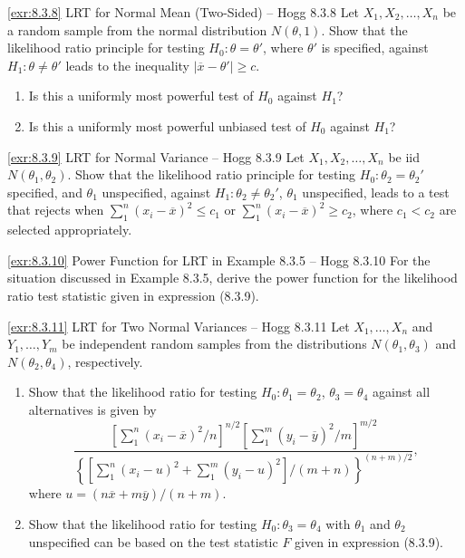 \begin{exercise}{\ref{exr:8.3.8} LRT for Normal Mean (Two-Sided) -- Hogg 8.3.8}\label{exr:8.3.8}
Let $X_1, X_2, \ldots, X_n$ be a random sample from the normal distribution $N(\theta, 1)$. Show that the likelihood ratio principle for testing $H_0: \theta = \theta'$, where $\theta'$ is specified, against $H_1: \theta \neq \theta'$ leads to the inequality $|\overline{x} - \theta'| \geq c$.
\begin{enumerate}
\item[(a)] Is this a uniformly most powerful test of $H_0$ against $H_1$?
\item[(b)] Is this a uniformly most powerful unbiased test of $H_0$ against $H_1$?
\end{enumerate}
\end{exercise}

\begin{exercise}{\ref{exr:8.3.9} LRT for Normal Variance -- Hogg 8.3.9}\label{exr:8.3.9}
Let $X_1, X_2, \ldots, X_n$ be iid $N(\theta_1, \theta_2)$. Show that the likelihood ratio principle for testing $H_0: \theta_2 = \theta_2'$ specified, and $\theta_1$ unspecified, against $H_1: \theta_2 \neq \theta_2'$, $\theta_1$ unspecified, leads to a test that rejects when $\sum_{1}^n(x_i - \overline{x})^2 \leq c_1$ or $\sum_{1}^n(x_i - \overline{x})^2 \geq c_2$, where $c_1 < c_2$ are selected appropriately.
\end{exercise}

\begin{exercise}{\ref{exr:8.3.10} Power Function for LRT in Example 8.3.5 -- Hogg 8.3.10}\label{exr:8.3.10}
For the situation discussed in Example 8.3.5, derive the power function for the likelihood ratio test statistic given in expression (8.3.9).
\end{exercise}

\begin{exercise}{\ref{exr:8.3.11} LRT for Two Normal Variances -- Hogg 8.3.11}\label{exr:8.3.11}
Let $X_1, \ldots, X_n$ and $Y_1, \ldots, Y_m$ be independent random samples from the distributions $N(\theta_1, \theta_3)$ and $N(\theta_2, \theta_4)$, respectively.
\begin{enumerate}
\item[(a)] Show that the likelihood ratio for testing $H_0: \theta_1 = \theta_2$, $\theta_3 = \theta_4$ against all alternatives is given by
\[
\frac{\left[ \sum_{1}^n (x_i - \overline{x})^2 / n \right]^{n/2} \left[ \sum_{1}^m (y_i - \overline{y})^2 / m \right]^{m/2}}{\left\{\left[ \sum_{1}^n (x_i - u)^2 + \sum_{1}^m (y_i - u)^2 \right] / (m + n) \right\}^{(n+m)/2}},
\]
where $u = (n\overline{x} + m\overline{y}) / (n + m)$.
\item[(b)] Show that the likelihood ratio for testing $H_0: \theta_3 = \theta_4$ with $\theta_1$ and $\theta_2$ unspecified can be based on the test statistic $F$ given in expression (8.3.9).
\end{enumerate}
\end{exercise}

